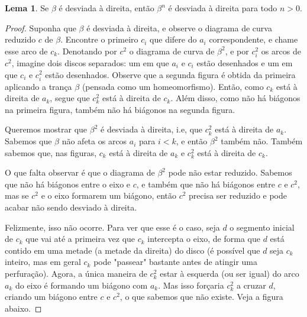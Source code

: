 \documentclass[a4paper,portuguese,11pt,twoside, leqno]{book}
\theoremstyle{definition}
\newtheorem{lemma}[theorem]{Lema}
\begin{document}
	\begin{lemma}
		\label{desviada a direita, sempre a direita}
		Se $\beta$ é desviada à direita, então $\beta^n$ é desviada à direita para todo $n>0$.
	\end{lemma}
	\begin{proof}
		Suponha que $\beta$ é desviada à direita, e observe o diagrama de curva reduzido $c$ de $\beta$. Encontre o primeiro $c_i$ que difere do $a_i$ correspondente, e chame esse arco de $c_k$. Denotando por $c^2$ o diagrama de curva de $\beta^2$, e por $c_i^2$ os arcos de $c^2$, imagine dois discos separados: um em que $a_i$ e $c_i$ estão desenhados e um em que $c_i$ e $c_i^2$ estão desenhados. Observe que a segunda figura é obtida da primeira aplicando a trança $\beta$ (pensada como um homeomorfismo). Então, como $c_k$ está à direita de $a_k$, segue que $c_k^2$ está à direita de $c_k$. Além disso, como não há biágonos na primeira figura, também não há biágonos na segunda figura.
		\par\vspace{0.3cm} Queremos mostrar que $\beta^2$ é desviada à direita, i.e, que $c_k^2$ está à direita de $a_k$. Sabemos que $\beta$ não afeta os arcos $a_i$ para $i<k$, e então $\beta^2$ também não. Também sabemos que, nas figuras, $c_k$ está à direita de $a_k$ e $c_k^2$ está à direita de $c_k$.
		\par\vspace{0.3cm} O que falta observar é que o diagrama de $\beta^2$ pode não estar reduzido. Sabemos que não há biágonos entre o eixo e $c$, e também que não há biágonos entre $c$ e $c^2$, mas se $c^2$ e o eixo formarem um biágono, então $c^2$ precisa ser reduzido e pode acabar não sendo desviado à direita.
		\par\vspace{0.3cm} Felizmente, isso não ocorre. Para ver que esse é o caso, seja $d$ o segmento inicial de $c_k$ que vai até a primeira vez que $c_k$ intercepta o eixo, de forma que $d$ está contido em uma metade (a metade da direita) do disco (é possível que $d$ seja $c_k$ inteiro, mas em geral $c_k$ pode "passear" bastante antes de atingir uma perfuração). Agora, a única maneira de $c_k^2$ estar à esquerda (ou ser igual) do arco $a_k$ do eixo é formando um biágono com $a_k$. Mas isso forçaria $c_k^2$ a cruzar $d$, criando um biágono entre $c$ e $c^2$, o que sabemos que não existe. Veja a figura abaixo.
		

\end{proof}
\end{document}
